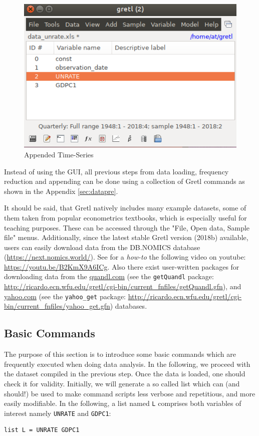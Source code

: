 \documentclass[11pt]{article}
\begin{document}
\begin{figure}[!h]
	\centering
	\includegraphics[width=.42\textwidth]{../figures/gretl_after_appending}
	\caption{Appended Time-Series}
	\label{fig:append}
\end{figure}

Instead of using the GUI, all previous steps from data loading, frequency reduction and appending can be done using a collection of Gretl commands as shown in the Appendix \ref{sec:datapre}.

It should be said, that Gretl natively includes many example datasets, some of them taken from popular econometrics textbooks, which is especially useful for teaching purposes. These can be accessed through the "File, Open data, Sample file" menus. Additionally, since the latest stable Gretl version (2018b) available, users can easily download data from the DB.NOMICS database (\url{https://next.nomics.world/}). See for a \textit{how-to} the following video on youtube: \url{https://youtu.be/B2KmX9A6ICg}. Also there exist user-written packages for downloading data from the \url{quandl.com} (see the \texttt{getQuandl} package: \url{http://ricardo.ecn.wfu.edu/gretl/cgi-bin/current_fnfiles/getQuandl.gfn}), and \url{yahoo.com} (see the \texttt{yahoo\_get} package: \url{http://ricardo.ecn.wfu.edu/gretl/cgi-bin/current_fnfiles/yahoo_get.gfn}) databases.


\subsection{Basic Commands}
The purpose of this section is to introduce some basic commands which are frequently executed when doing data analysis. In the following, we proceed with the dataset compiled in the previous step. Once the data is loaded, one should check it for validity. %
Initially, we will generate a so called list which can (and should!) be used to make command scripts less verbose and repetitious, and more easily modifiable. In the following, a list named \texttt{L} comprises both variables of interest namely \texttt{UNRATE} and \texttt{GDPC1}:
\begin{Verbatim}[baselinestretch=0.75, fontsize=\small]
list L = UNRATE GDPC1
\end{Verbatim}
\end{document}
